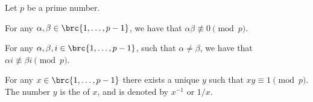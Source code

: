 \begin{lemma}
        Let $p$ be a prime number.
        \begin{compactenumA}
            \item For any $\alpha, \beta \in \brc{ 1, \ldots, p-1}$,
            we have that $\alpha \beta \not \equiv 0 \pmod{p}$.
            
            \item For any $\alpha, \beta, i \in \brc{ 1,\ldots, p-1}$,
            such that $\alpha \ne \beta$, we have that
            $\alpha i \nequiv \beta i \pmod{p}$.
            
            
            \item For any $x \in \brc{1,\ldots, p-1}$ there exists a
            unique $y$ such that $xy \equiv 1 \pmod{p}$. The number
            $y$ is the  of $x$, and is denoted by
            $x^{-1}$ or $1/x$.
        \end{compactenumA}
    \end{lemma}
